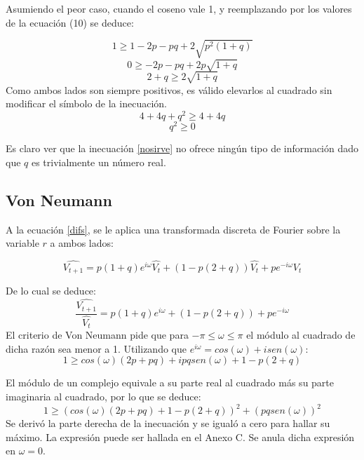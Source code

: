 ﻿\documentclass[%
final,
%
reprint,
%
notitlepage,
narroweqnarray,
inline,
twoside,
invited
]{ieee}
\begin{document}
Asumiendo el peor caso, cuando el coseno vale 1, y reemplazando por los valores de la ecuación (10) se deduce: 

\[
1 \geq 1-2p-pq + 2\sqrt{p^2(1+q)}
\]
\[
0 \geq -2p - pq + 2p\sqrt{1+q}
\]
\[
2 +q \geq 2\sqrt{1+q}
\]
Como ambos lados son siempre positivos, es válido elevarlos al cuadrado sin modificar el símbolo de la inecuación.
\[
4 + 4q + q^2 \geq 4+4q
\]
\begin{equation}\label{nosirve}
 q^2 \geq 0
\end{equation}

Es claro ver que la inecuación \eqref{nosirve} no ofrece ningún tipo de información dado que $q$ es trivialmente 
un número real.

\subsection{Von Neumann}

A la ecuación \eqref{difs}, se le aplica una transformada discreta de Fourier sobre la variable $r$ a ambos lados: 

\[
\widehat{V_{t+1}} = p(1+q)e^{i\omega}\widehat{V_t}+(1-p(2+q))\widehat{V_t}+pe^{-i\omega}\widehat{V_t}
\]

De lo cual se deduce:
\begin{equation}
\frac{\widehat{V_{t+1}}}{\widehat{V_t}} = p(1+q)e^{i\omega}+(1-p(2+q))+pe^{-i\omega}
\end{equation}
El criterio de Von Neumann pide que para $-\pi \leq \omega \leq \pi$ el módulo al cuadrado de dicha razón 
sea menor a 1. Utilizando que $e^{i\omega} = cos(\omega) + i sen(\omega)$:
\begin{equation}
1 \geq  cos(\omega) (2p+pq) + ipqsen(\omega)+ 1 - p(2+q)
\end{equation}

El módulo de 
un complejo equivale a su parte real al cuadrado más su parte imaginaria al cuadrado, por lo que se deduce:
\begin{equation}\label{vnvn}
1 \geq  (cos(\omega) (2p+pq) + 1 - p(2+q))^2 + (pqsen(\omega))^2
\end{equation}
Se derivó la parte derecha de la inecuación y se igualó a cero para hallar su máximo. La expresión 
puede ser hallada en el Anexo C. Se anula dicha expresión en $\omega =0$.
\end{document}
